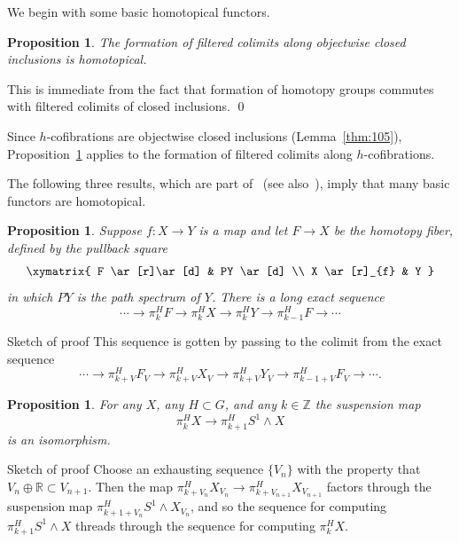 \documentclass{amsart}
\newtheorem{prop}[equation]{Proposition}
\theoremstyle{definition}
\theoremstyle{remark}
\newenvironment{pf}{\bigskip{\em Proof:\/}}{\qed\medskip}
\newenvironment{pf*}[1]{\bigskip{\em #1:\/}}{\qed\medskip}
\newcommand{\Z}{{\mathbb Z}}
\newcommand{\R}{{\mathbb R}}
\newcommand{\thmListItem}[1]{\rm \romannumeral#1)}
\begin{document}
We begin with some basic homotopical functors.  
\begin{prop}
\label{thm:255}
The formation of filtered colimits along objectwise closed
inclusions is homotopical. 
\end{prop}

\begin{pf}
This is immediate from the fact that formation of homotopy groups
commutes with filtered colimits of closed inclusions.
\end{pf}

Since $h$-cofibrations are objectwise closed inclusions
(Lemma~\ref{thm:105}), Proposition~\ref{thm:255} applies to the
formation of filtered colimits along $h$-cofibrations.

The following three results, which are part of~\cite[Theorem
III.3.5]{MR1922205} (see also~\cite[Theorem 7.4~\thmListItem{4}]{MR1806878}),
imply that many basic functors are homotopical. 

\begin{prop}
\label{thm:137}
Suppose $f:X\to Y$ is a map and let $F\to X$ be the homotopy fiber,
defined by the pullback square
\[
\xymatrix{
F  \ar[r]\ar[d]  & PY
\ar[d] \\ 
X  \ar[r]_{f}        & Y
}
\]
in which $PY$ is the path spectrum of $Y$.  There is a long exact
sequence
\[
\cdots\to \pi^{H}_{k}F\to \pi^{H}_{k}X\to \pi^{H}_{k}Y \to
\pi^{H}_{k-1} F\to\cdots
\]
\end{prop}

\begin{pf*}{Sketch of proof}
This sequence is gotten by passing to the colimit from the exact sequence
\[
\cdots\to \pi^{H}_{k+V}F_{V}\to \pi^{H}_{k+V}X_{V}\to \pi^{H}_{k+V}Y_{V} \to
\pi^{H}_{k-1+V} F_{V}\to\cdots.
\]
\end{pf*}

\begin{prop}
\label{thm:53}
For any $X$, any $H\subset G$, and any $k\in\Z$ the suspension map 
\[
\pi^{H}_{k}X\to \pi^{H}_{k+1}S^{1}\wedge X
\]
is an isomorphism.
\end{prop}

\begin{pf*}{Sketch of proof}
Choose an exhausting sequence $\{V_{n} \}$ with the property that
$V_{n}\oplus \R\subset V_{n+1}$.  Then the map
$\pi^{H}_{k+V_{n}}X_{V_{n}}\to \pi^{H}_{k+V_{n+1}}X_{V_{n+1}}$ factors
through the suspension map $\pi^{H}_{k+1+V_{n}}S^{1}\wedge X_{V_{n}}$,
and so the sequence for computing $\pi^{H}_{k+1}S^{1}\wedge X$ threads
through the sequence for computing $\pi^{H}_{k}X$.
\end{pf*}
\end{document}
